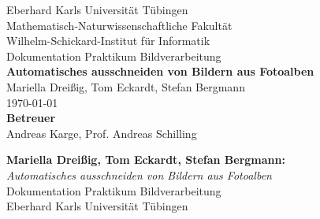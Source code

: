 \documentclass[12pt,a4paper]{scrreprt}
\begin{document}
\begin{titlepage}
\begin{center}
\LARGE Eberhard Karls Universität Tübingen\\
\large Mathematisch-Naturwissenschaftliche Fakultät \\
Wilhelm-Schickard-Institut für Informatik\\
[3cm]
\huge Dokumentation Praktikum Bildverarbeitung\\
[2cm]
\Large\textbf{Automatisches ausschneiden von Bildern aus Fotoalben}\\
[1.5cm]
\large Mariella Dreißig, Tom Eckardt, Stefan Bergmann\\
[0.5cm]
\today\\
\vfill
\small\textbf{Betreuer}\\[0.3cm]
\large Andreas Karge, Prof. Andreas Schilling\\
\end{center}
\end{titlepage}

\thispagestyle{empty}
\vspace*{\fill}
\textbf{Mariella Dreißig, Tom Eckardt, Stefan Bergmann:}\\
\emph{Automatisches ausschneiden von Bildern aus Fotoalben}\\
Dokumentation Praktikum Bildverarbeitung \\
Eberhard Karls Universität Tübingen\\
\newpage







\end{document}
